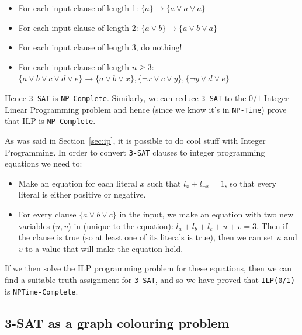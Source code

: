 \begin{itemize}
  \item For each input clause of length 1:
    $\{a\} \rightarrow \{a \vee a \vee a\}$ 
  \item For each input clause of length 2:
    $\{a \vee b\} \rightarrow \{a \vee b \vee a\}$ 
  \item For each input clause of length 3, do nothing!
  \item For each input clause of length $n \geq 3$:
    $\{a \vee b \vee c \vee d \vee e\} \rightarrow
      \{a \vee b \vee x\},
      \{\neg x \vee c \vee y\},
      \{\neg y \vee d \vee e\}$ 
\end{itemize}

Hence \texttt{3-SAT} is \texttt{NP-Complete}. Similarly, we can reduce
\texttt{3-SAT} to the $0/1$ Integer Linear Programming problem and hence (since
we know it's in \texttt{NP-Time}) prove that ILP is \texttt{NP-Complete}.

As was said in Section~\ref{sec:ip}, it is possible to do cool stuff with
Integer Programming. In order to convert \texttt{3-SAT} clauses to integer
programming equations we need to:

\begin{itemize}
  \item Make an equation for each literal $x$ such that $l_x + l_{\neg x} = 1$,
  so that every literal is either positive or negative.

  \item For every clause $\{a \vee b \vee c\}$ in the input, we make an 
  equation with two new variables ($u,v$) in (unique to the equation):
  $l_a + l_b + l_c + u + v = 3$. Then if the clause is true (so at least one of 
  its literals is true), then we can set $u$ and $v$ to a value that will make 
  the equation hold.
\end{itemize}


If we then solve the ILP programming problem for these equations, then we can
find a suitable truth assignment for \texttt{3-SAT}, and so we have proved that
\texttt{ILP(0/1)} is \texttt{NPTime-Complete}.

\subsection{3-SAT as a graph colouring problem}
\label{sat-colour}

